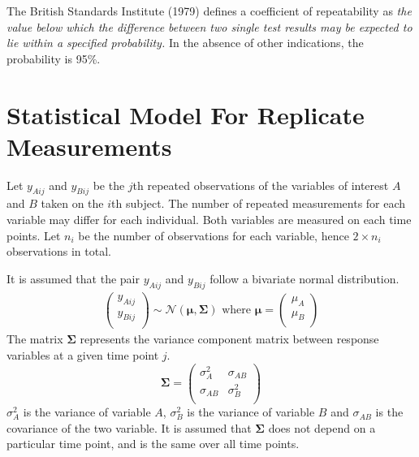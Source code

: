 \documentclass[12pt, a4paper]{report}
\theoremstyle{plain}
\theoremstyle{definition}
\theoremstyle{remark}
\begin{document}
	The British Standards Institute (1979) defines a coefficient of repeatability  as \emph{the value below which the difference between two single test results may be expected to lie within a specified probability.} In the absence of other indications, the probability is 95\%.
	
	
	


		\section{Statistical Model For Replicate Measurements}
	Let $y_{Aij}$ and $y_{Bij}$ be the $j$th repeated observations of the variables of interest $A$ and $B$ taken on the $i$th subject. The number of repeated measurements for each variable may differ for each individual.
	Both variables are measured on each time points. Let $n_{i}$ be the number of observations for each variable, hence $2\times n_{i}$ observations in total.
	
	It is assumed that the pair $y_{Aij}$ and $y_{Bij}$ follow a bivariate normal distribution.
	\begin{eqnarray}
	\left(
	\begin{array}{c}
	y_{Aij} \\
	y_{Bij} \\
	\end{array}
	\right) \sim \mathcal{N}(
	\boldsymbol{\mu}, \boldsymbol{\Sigma})\mbox{   where } \boldsymbol{\mu} = \left(
	\begin{array}{c}
	\mu_{A} \\
	\mu_{B} \\
	\end{array}
	\right)
	\end{eqnarray}
	The matrix $\boldsymbol{\Sigma}$ represents the variance component matrix between response variables at a given time point $j$.
	\begin{equation}
	\boldsymbol{\Sigma} = \left( \begin{array}{cc}
	\sigma^2_{A} & \sigma_{AB} \\
	\sigma_{AB} & \sigma^2_{B}\\
	\end{array}\right)
	\end{equation}
	$\sigma^2_{A}$ is the variance of variable $A$, $\sigma^2_{B}$ is the variance of variable $B$ and $\sigma_{AB}$ is the covariance of the two variable. It is assumed that $\boldsymbol{\Sigma}$ does not depend on a particular time point, and is the same over all time points.
	
\end{document}
